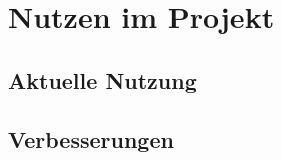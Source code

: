 \chapter{Nutzen im Projekt}\label{ch:nutzen-im-projekt}


\section{Aktuelle Nutzung}\label{sec:aktuelle-nutzung}


\section{Verbesserungen}\label{sec:verbesserungen}
